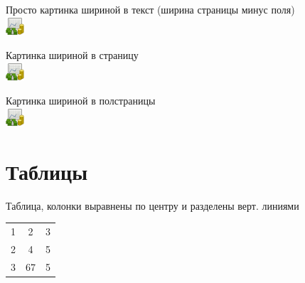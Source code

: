 \documentclass[a4paper,12pt]{article}                       %
\begin{document}
Просто картинка шириной в текст (ширина страницы минус поля)\\
\includegraphics[width=\textwidth]{7-image.png}

Картинка шириной в страницу\\
\includegraphics[width=\paperwidth]{7-image.png}

Картинка шириной в полстраницы\\
\includegraphics[width=0.5\paperwidth]{7-image.png}

\section{Таблицы}


Таблица, колонки выравнены по центру и разделены верт. линиями

\begin{tabular}{c|c|c}
    1 & 2  & 3 \\
    2 & 4  & 5 \\
    3 & 67 & 5
\end{tabular}
\end{document}
